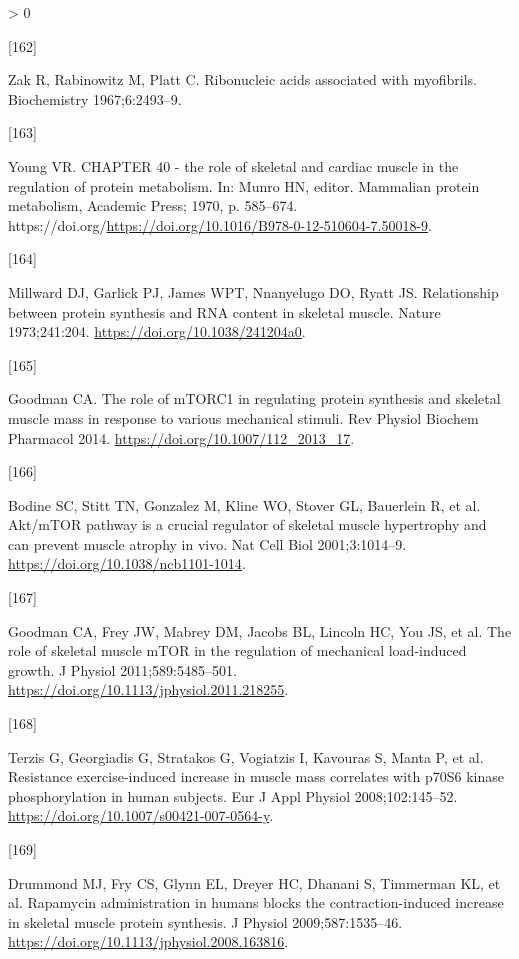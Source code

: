 \documentclass[twoside,10pt]{gihclass} %
\newlength{\cslhangindent}
\newlength{\csllabelwidth}
\newenvironment{CSLReferences}[3] %
 {%
  \setlength{\parindent}{0pt}
  \ifodd #1 \everypar{\setlength{\hangindent}{\cslhangindent}}\ignorespaces\fi
  \ifnum #2 > 0
  \setlength{\parskip}{#2\baselineskip}
  \fi
 }%
 {}
\newcommand{\CSLLeftMargin}[1]{\parbox[t]{\maxof{\widthof{#1}}{\csllabelwidth}}{#1}}
\newcommand{\CSLRightInline}[1]{\parbox[t]{\linewidth}{#1}}
\begin{document}
\begin{CSLReferences}{0}{0}
\leavevmode\hypertarget{ref-RN2054}{}%
\CSLLeftMargin{{[}162{]} }
\CSLRightInline{Zak R, Rabinowitz M, Platt C. Ribonucleic acids associated with myofibrils. Biochemistry 1967;6:2493--9.}

\leavevmode\hypertarget{ref-RN2223}{}%
\CSLLeftMargin{{[}163{]} }
\CSLRightInline{Young VR. CHAPTER 40 - the role of skeletal and cardiac muscle in the regulation of protein metabolism. In: Munro HN, editor. Mammalian protein metabolism, Academic Press; 1970, p. 585--674. https://doi.org/\url{https://doi.org/10.1016/B978-0-12-510604-7.50018-9}.}

\leavevmode\hypertarget{ref-RN2145}{}%
\CSLLeftMargin{{[}164{]} }
\CSLRightInline{Millward DJ, Garlick PJ, James WPT, Nnanyelugo DO, Ryatt JS. Relationship between protein synthesis and RNA content in skeletal muscle. Nature 1973;241:204. \url{https://doi.org/10.1038/241204a0}.}

\leavevmode\hypertarget{ref-RN1049}{}%
\CSLLeftMargin{{[}165{]} }
\CSLRightInline{Goodman CA. The role of mTORC1 in regulating protein synthesis and skeletal muscle mass in response to various mechanical stimuli. Rev Physiol Biochem Pharmacol 2014. \url{https://doi.org/10.1007/112_2013_17}.}

\leavevmode\hypertarget{ref-RN782}{}%
\CSLLeftMargin{{[}166{]} }
\CSLRightInline{Bodine SC, Stitt TN, Gonzalez M, Kline WO, Stover GL, Bauerlein R, et al. Akt/mTOR pathway is a crucial regulator of skeletal muscle hypertrophy and can prevent muscle atrophy in vivo. Nat Cell Biol 2001;3:1014--9. \url{https://doi.org/10.1038/ncb1101-1014}.}

\leavevmode\hypertarget{ref-RN1072}{}%
\CSLLeftMargin{{[}167{]} }
\CSLRightInline{Goodman CA, Frey JW, Mabrey DM, Jacobs BL, Lincoln HC, You JS, et al. The role of skeletal muscle mTOR in the regulation of mechanical load-induced growth. J Physiol 2011;589:5485--501. \url{https://doi.org/10.1113/jphysiol.2011.218255}.}

\leavevmode\hypertarget{ref-RN785}{}%
\CSLLeftMargin{{[}168{]} }
\CSLRightInline{Terzis G, Georgiadis G, Stratakos G, Vogiatzis I, Kavouras S, Manta P, et al. Resistance exercise-induced increase in muscle mass correlates with p70S6 kinase phosphorylation in human subjects. Eur J Appl Physiol 2008;102:145--52. \url{https://doi.org/10.1007/s00421-007-0564-y}.}

\leavevmode\hypertarget{ref-RN780}{}%
\CSLLeftMargin{{[}169{]} }
\CSLRightInline{Drummond MJ, Fry CS, Glynn EL, Dreyer HC, Dhanani S, Timmerman KL, et al. Rapamycin administration in humans blocks the contraction-induced increase in skeletal muscle protein synthesis. J Physiol 2009;587:1535--46. \url{https://doi.org/10.1113/jphysiol.2008.163816}.}


\end{CSLReferences}
\end{document}
